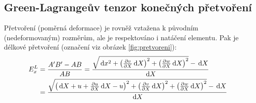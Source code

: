 
\subsection{Green-Lagrangeův tenzor konečných přetvoření}\label{sec:green-lagrange}
Přetvoření (poměrná deformace) je rovněž vztažena k původním (nedeformovaným) rozměrům, ale je respektováno i natáčení elementu. Pak je délkové přetvoření (označení viz obrázek \ref{fig:pretvoreni}):
\begin{equation}\begin{split}
	E^L_x &= \frac{A'B' - AB}{AB}
	= \frac{\sqrt{\,\mathrm{d} x^2 + \left( \frac{\partial v}{\partial X} \,\mathrm{d} X \right)^2 + \left( \frac{\partial w}{\partial X} \,\mathrm{d} X \right)^2} - \,\mathrm{d} X}{\,\mathrm{d} X}\\
	&= \frac{\sqrt{ \left( \,\mathrm{d} X + u + \frac{\partial u}{\partial X} \,\mathrm{d} X - u \right)^2 + \left( \frac{\partial v}{\partial X} \,\mathrm{d} X \right)^2 + \left( \frac{\partial w}{\partial X} \,\mathrm{d} X \right)^2} - \,\mathrm{d} X}{\,\mathrm{d} X}
\end{split}\end{equation}

